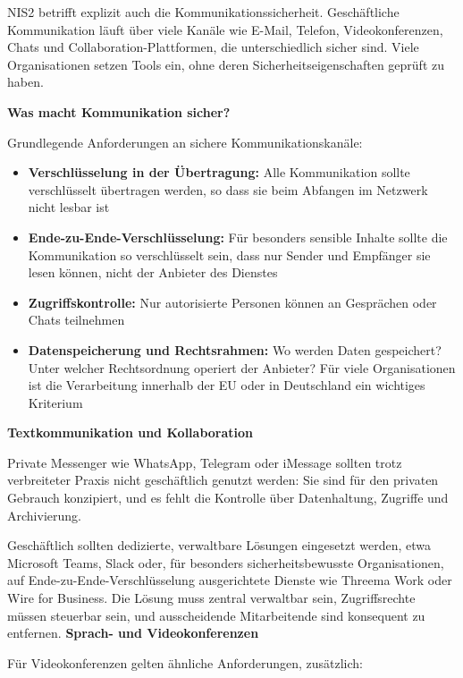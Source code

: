NIS2 betrifft explizit auch die Kommunikationssicherheit. Geschäftliche Kommunikation läuft über viele Kanäle wie E-Mail, Telefon, Videokonferenzen, Chats und Collaboration-Plattformen, die unterschiedlich sicher sind. Viele Organisationen setzen Tools ein, ohne deren Sicherheitseigenschaften geprüft zu haben.

\textbf{Was macht Kommunikation sicher?}

Grundlegende Anforderungen an sichere Kommunikationskanäle:

\begin{itemize}
    \item \textbf{Verschlüsselung in der Übertragung:} Alle Kommunikation sollte verschlüsselt übertragen werden, so dass sie beim Abfangen im Netzwerk nicht lesbar ist
    \item \textbf{Ende-zu-Ende-Verschlüsselung:} Für besonders sensible Inhalte sollte die Kommunikation so verschlüsselt sein, dass nur Sender und Empfänger sie lesen können, nicht der Anbieter des Dienstes
    \item \textbf{Zugriffskontrolle:} Nur autorisierte Personen können an Gesprächen oder Chats teilnehmen
    \item \textbf{Datenspeicherung und Rechtsrahmen:} Wo werden Daten gespeichert? Unter welcher Rechtsordnung operiert der Anbieter? Für viele Organisationen ist die Verarbeitung innerhalb der EU oder in Deutschland ein wichtiges Kriterium
\end{itemize}

\textbf{Textkommunikation und Kollaboration}

Private Messenger wie WhatsApp, Telegram oder iMessage sollten trotz verbreiteter Praxis nicht geschäftlich genutzt werden: Sie sind für den privaten Gebrauch konzipiert, und es fehlt die Kontrolle über Datenhaltung, Zugriffe und Archivierung.

Geschäftlich sollten dedizierte, verwaltbare Lösungen eingesetzt werden, etwa Microsoft Teams, Slack oder, für besonders sicherheitsbewusste Organisationen, auf Ende-zu-Ende-Verschlüsselung ausgerichtete Dienste wie Threema Work oder Wire for Business. Die Lösung muss zentral verwaltbar sein, Zugriffsrechte müssen steuerbar sein, und ausscheidende Mitarbeitende sind konsequent zu entfernen.
\newpage
\textbf{Sprach- und Videokonferenzen}

Für Videokonferenzen gelten ähnliche Anforderungen, zusätzlich:


